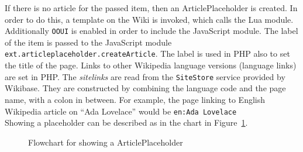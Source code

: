 If there is no article for the passed item, then an ArticlePlaceholder is created. In order to do this, a template on the Wiki is invoked, which calls the Lua module. Additionally \texttt{\justify OOUI} is enabled in order to include the JavaScript module. The label of the item is passed to the JavaScript module \texttt{\justify ext.articleplaceholder.createArticle}. The label is used in PHP also to set the title of the page. Links to other Wikipedia language versions (language links) are set in PHP. The \textit{sitelinks} are read from the \texttt{\justify SiteStore} service provided by Wikibase. They are constructed by combining the language code and the page name, with a colon in between. For example, the page linking to English Wikipedia article on ``Ada Lovelace'' would be \texttt{\justify en:Ada Lovelace}\\
Showing a placeholder can be described as in the chart in Figure~\ref{fig:showpl}. 
\begin{figure}[H]
	\centering
	
	\caption{Flowchart for showing a ArticlePlaceholder}
	\label{fig:showpl}
\end{figure}
